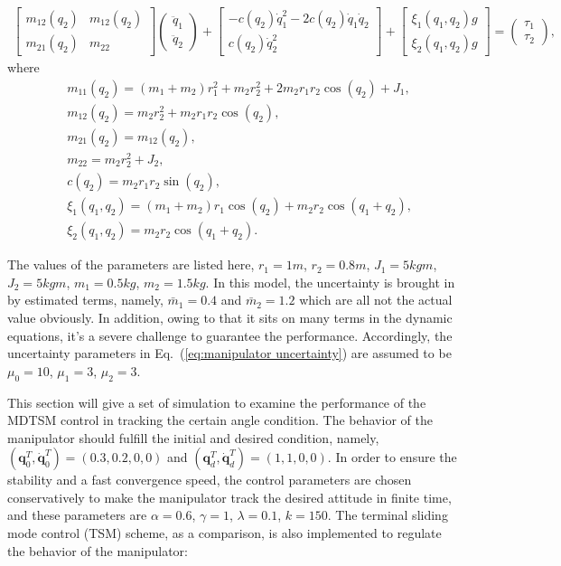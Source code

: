 \documentclass[3p]{elsarticle}
\theoremstyle{plain}
\theoremstyle{remark}
\begin{document}
\begin{align}
\begin{bmatrix}
m_{12}(q_2) &m_{12}(q_2)\\
m_{21}(q_2) &m_{22}
\end{bmatrix}
\begin{pmatrix}
\ddot q_1\\
\ddot q_2
\end{pmatrix}
+
\begin{bmatrix}
-c(q_2)\dot q_1^2-2c(q_2)\dot q_1\dot q_2\\
c(q_2)\dot q_2^2
\end{bmatrix}+
\begin{bmatrix}
\xi_1(q_1,q_2) g\\
\xi_2(q_1,q_2) g
\end{bmatrix}=
\begin{pmatrix}
\tau_1\\
\tau_2
\end{pmatrix},\label{eq:manipulator}
\end{align}
where
\begin{align*}
&m_{11}(q_2)=(m_1+m_2)r_1^2+m_2r_2^2+2m_2r_1r_2\cos(q_2)+J_1,\\
&m_{12}(q_2)=m_2r_2^2+m_2r_1r_2\cos(q_2),\\
&m_{21}(q_2)=m_{12}(q_2),\\
&m_{22}=m_2r_2^2+J_2,\\
&c(q_2)=m_2r_1r_2\sin(q_2),\\
&\xi_1(q_1,q_2) =(m_1+m_2)r_1\cos(q_2)+m_2r_2\cos(q_1+q_2),\\
&\xi_2(q_1,q_2) = m_2r_2\cos(q_1+q_2).
\end{align*}\par
The values of the parameters are listed here, $r_1=1m$, $r_2=0.8m$, $J_1=5 kgm$, $J_2=5kgm$, $m_1=0.5kg$, $m_2=1.5kg$. In this model, the uncertainty is brought in by estimated terms, namely, $\bar m_1=0.4$ and $\bar m_2=1.2$ which are all not the actual value obviously. In addition, owing to that it sits on many terms in the dynamic equations, it's a severe challenge to guarantee the performance. Accordingly, the uncertainty parameters in Eq.~(\ref{eq:manipulator uncertainty}) are assumed to be $\mu_0=10$, $\mu_1=3$, $\mu_2=3$.\par
This section will give a set of simulation to examine the performance of the MDTSM control in tracking the certain angle condition. The behavior of the manipulator should fulfill the initial and desired condition, namely, $(\bm q_0^T, \dot{\bm q}_0^T)= (0.3,0.2,0,0)$ and $({\bm q}_d^T,\dot{\bm q}_d^T)=(1,1,0,0)$. In order to ensure the stability and a fast convergence speed, the control parameters are chosen conservatively to make the manipulator track the desired attitude in finite time, and these parameters are $\alpha = 0.6$, $\gamma = 1$, $\lambda = 0.1$, $k = 150$. The terminal sliding mode control (TSM) scheme, as a comparison, is also implemented to regulate the behavior of the manipulator:
\end{document}

